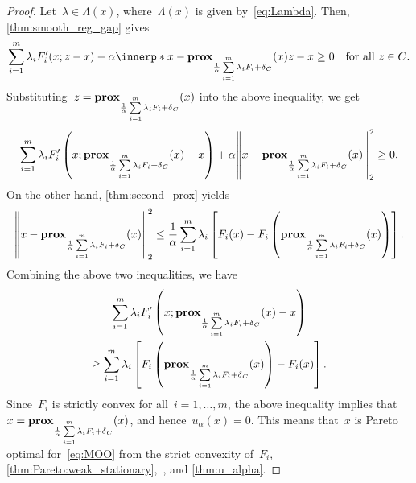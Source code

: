 \documentclass[../../main]{subfiles}
\begin{document}
\begin{proof}
    Let~$\lambda \in \Lambda(x)$, where~$\Lambda(x)$ is given by~\cref{eq:Lambda}.
    Then, \cref{thm:smooth_reg_gap} gives
    \[
        \sum_{i = 1}^{m} \lambda_i F_i'(x; z - x) - \alpha \innerp*{ x - \prox_{\frac{1}{\alpha} \sum\limits_{i = 1}^{m} \lambda_i F_i + \indicator_C}(x) }{z - x} \ge 0 \forallcondition{z \in C}
    .\] 
    Substituting~$z = \prox_{\frac{1}{\alpha} \sum\limits_{i = 1}^{m} \lambda_i F_i + \indicator_C}(x)$ into the above inequality, we get
    \[
        \sum_{i = 1}^{m} \lambda_i F_i' \left(x; \prox_{\frac{1}{\alpha} \sum\limits_{i = 1}^{m} \lambda_i F_i + \indicator_C}(x) - x \right) + \alpha \norm*{ x - \prox_{\frac{1}{\alpha} \sum\limits_{i = 1}^{m} \lambda_i F_i + \indicator_C}(x) }_2^2 \ge 0
    .\]
    On the other hand, \cref{thm:second_prox} yields
    \[
        \norm*{x - \prox_{\frac{1}{\alpha} \sum\limits_{i = 1}^{m} \lambda_i F_i + \indicator_C}(x)}_2^2 \le \frac{1}{\alpha} \sum_{i = 1}^{m} \lambda_i \left[ F_i(x) - F_i\left(\prox_{\frac{1}{\alpha} \sum\limits_{i = 1}^{m} \lambda_i F_i + \indicator_C}(x)\right) \right] 
    .\]
    Combining the above two inequalities, we have
    \begin{multline}
        \sum_{i = 1}^{m} \lambda_i F_i' \left(x; \prox_{\frac{1}{\alpha} \sum\limits_{i = 1}^{m} \lambda_i F_i + \indicator_C}(x) - x \right) \\
        \ge \sum_{i = 1}^{m} \lambda_i \left[ F_i\left(\prox_{\frac{1}{\alpha} \sum\limits_{i = 1}^{m} \lambda_i F_i + \indicator_C}(x)\right) - F_i(x) \right] 
    .\end{multline}
    Since~$F_i$ is strictly convex for all~$i = 1, \dots, m$, the above inequality implies that~$x = \prox_{\frac{1}{\alpha} \sum\limits_{i = 1}^{m} \lambda_i F_i + \indicator_C}(x)$, and hence~$u_\alpha(x) = 0$.
    This means that~$x$ is Pareto optimal for~\cref{eq:MOO} from the strict convexity of~$F_i$, \cref{thm:Pareto:weak_stationary},~, and \cref{thm:u_alpha}.
\end{proof}
\end{document}
